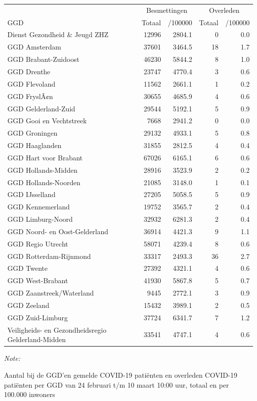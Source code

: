 \documentclass[
  english,
  man,floatsintext]{apa6}
\begin{document}
\begin{table}
\centering\begingroup\fontsize{10}{12}\selectfont

\begin{threeparttable}
\begin{tabular}{lrrrr}
\toprule
\multicolumn{1}{c}{ } & \multicolumn{2}{c}{Besmettingen} & \multicolumn{2}{c}{Overleden} \\
\cmidrule(l{3pt}r{3pt}){2-3} \cmidrule(l{3pt}r{3pt}){4-5}
GGD & Totaal & /100000 & Totaal & /100000\\
\midrule
Dienst Gezondheid \& Jeugd ZHZ & 12996 & 2804.1 & 0 & 0.0\\
GGD Amsterdam & 37601 & 3464.5 & 18 & 1.7\\
GGD Brabant-Zuidoost & 46230 & 5844.2 & 8 & 1.0\\
GGD Drenthe & 23747 & 4770.4 & 3 & 0.6\\
GGD Flevoland & 11562 & 2661.1 & 1 & 0.2\\
GGD FryslÃ¢n & 30655 & 4685.9 & 4 & 0.6\\
GGD Gelderland-Zuid & 29544 & 5192.1 & 5 & 0.9\\
GGD Gooi en Vechtstreek & 7668 & 2941.2 & 0 & 0.0\\
GGD Groningen & 29132 & 4933.1 & 5 & 0.8\\
GGD Haaglanden & 31855 & 2812.5 & 4 & 0.4\\
GGD Hart voor Brabant & 67026 & 6165.1 & 6 & 0.6\\
GGD Hollands-Midden & 28916 & 3523.9 & 2 & 0.2\\
GGD Hollands-Noorden & 21085 & 3148.0 & 1 & 0.1\\
GGD IJsselland & 27205 & 5058.5 & 5 & 0.9\\
GGD Kennemerland & 19752 & 3565.7 & 2 & 0.4\\
GGD Limburg-Noord & 32932 & 6281.3 & 2 & 0.4\\
GGD Noord- en Oost-Gelderland & 36914 & 4421.3 & 9 & 1.1\\
GGD Regio Utrecht & 58071 & 4239.4 & 8 & 0.6\\
GGD Rotterdam-Rijnmond & 33317 & 2493.3 & 36 & 2.7\\
GGD Twente & 27392 & 4321.1 & 4 & 0.6\\
GGD West-Brabant & 41930 & 5867.8 & 5 & 0.7\\
GGD Zaanstreek/Waterland & 9445 & 2772.1 & 3 & 0.9\\
GGD Zeeland & 15432 & 3989.1 & 2 & 0.5\\
GGD Zuid-Limburg & 37724 & 6341.7 & 7 & 1.2\\
Veiligheids- en Gezondheidsregio Gelderland-Midden & 33541 & 4747.1 & 4 & 0.6\\
\bottomrule
\end{tabular}
\begin{tablenotes}
\item \textit{Note: } 
\item Aantal bij de GGD’en gemelde COVID-19 patiënten en overleden COVID-19 patiënten per GGD van 24 februari t/m 10 maart 10:00 uur, totaal en per 100.000 inwoners
\end{tablenotes}
\end{threeparttable}
\endgroup{}
\end{table}
\end{document}
